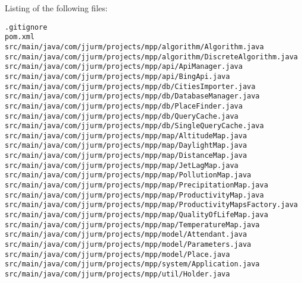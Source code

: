 Listing of the following files:

\noindent\texttt{.gitignore}\\
\texttt{pom.xml}\\
\texttt{src/main/java/com/jjurm/projects/mpp/algorithm/Algorithm.java}\\
\texttt{src/main/java/com/jjurm/projects/mpp/algorithm/DiscreteAlgorithm.java}\\
\texttt{src/main/java/com/jjurm/projects/mpp/api/ApiManager.java}\\
\texttt{src/main/java/com/jjurm/projects/mpp/api/BingApi.java}\\
\texttt{src/main/java/com/jjurm/projects/mpp/db/CitiesImporter.java}\\
\texttt{src/main/java/com/jjurm/projects/mpp/db/DatabaseManager.java}\\
\texttt{src/main/java/com/jjurm/projects/mpp/db/PlaceFinder.java}\\
\texttt{src/main/java/com/jjurm/projects/mpp/db/QueryCache.java}\\
\texttt{src/main/java/com/jjurm/projects/mpp/db/SingleQueryCache.java}\\
\texttt{src/main/java/com/jjurm/projects/mpp/map/AltitudeMap.java}\\
\texttt{src/main/java/com/jjurm/projects/mpp/map/DaylightMap.java}\\
\texttt{src/main/java/com/jjurm/projects/mpp/map/DistanceMap.java}\\
\texttt{src/main/java/com/jjurm/projects/mpp/map/JetLagMap.java}\\
\texttt{src/main/java/com/jjurm/projects/mpp/map/PollutionMap.java}\\
\texttt{src/main/java/com/jjurm/projects/mpp/map/PrecipitationMap.java}\\
\texttt{src/main/java/com/jjurm/projects/mpp/map/ProductivityMap.java}\\
\texttt{src/main/java/com/jjurm/projects/mpp/map/ProductivityMapsFactory.java}\\
\texttt{src/main/java/com/jjurm/projects/mpp/map/QualityOfLifeMap.java}\\
\texttt{src/main/java/com/jjurm/projects/mpp/map/TemperatureMap.java}\\
\texttt{src/main/java/com/jjurm/projects/mpp/model/Attendant.java}\\
\texttt{src/main/java/com/jjurm/projects/mpp/model/Parameters.java}\\
\texttt{src/main/java/com/jjurm/projects/mpp/model/Place.java}\\
\texttt{src/main/java/com/jjurm/projects/mpp/system/Application.java}\\
\texttt{src/main/java/com/jjurm/projects/mpp/util/Holder.java}\\

